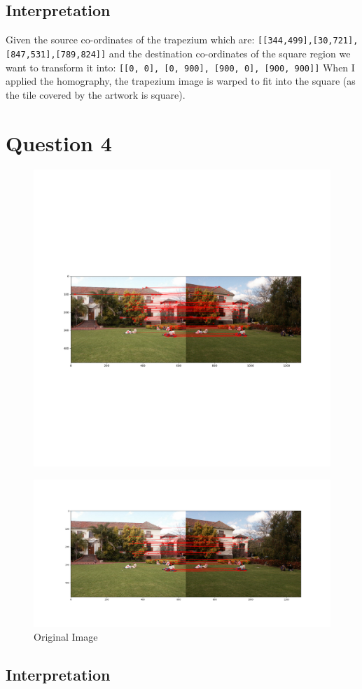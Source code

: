 \documentclass{article}
\begin{document}
\subsection{Interpretation}
Given the source co-ordinates of the trapezium which are:
\newline{}
\texttt{[[344,499],[30,721],[847,531],[789,824]]}
\newline{}
and the destination co-ordinates of the square region we want to transform it into:
\newline{}
\texttt{[[0, 0], [0, 900], [900, 0], [900, 900]]}
When I applied the homography, the trapezium image is warped to fit into the square (as the tile covered by
 the artwork is square).


\section{Question 4}
\begin{figure}[H]
    \centering
    \includegraphics[trim={5cm 5cm 5cm 5cm},clip,width=\textwidth]{q4/output_1.png}
    \caption{}
\end{figure}

\begin{figure}[H]
    \centering
    \includegraphics[trim={5cm 5cm 5cm 5cm},clip,width=\textwidth]{q4/ouput_3.png}
    \caption{Original Image}
\end{figure}

\subsection{Interpretation}
\end{document}
